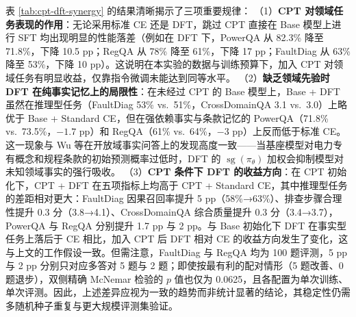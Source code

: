 \documentclass[fontset=fandol,type=master,campus=shenzhen,etitleauto=true]{hithesisbook}
\begin{document}
\begin{table}[htbp]
\centering
\caption{初始化基座（Base vs.\ CPT）与微调目标（Standard CE vs.\ DFT）的 $2 \times 2$ 对比结果}
\label{tab:cpt-dft-synergy}
\small
\setlength{\tabcolsep}{4pt}
\renewcommand{\arraystretch}{1.15}
\end{table}

表 \ref{tab:cpt-dft-synergy} 的结果清晰揭示了三项重要规律：
（1）\textbf{CPT 对领域任务表现的作用}：无论采用标准 CE 还是 DFT，跳过 CPT 直接在 Base 模型上进行 SFT 均出现明显的性能落差（例如在 DFT 下，PowerQA 从 82.3\% 降至 71.8\%，下降 10.5 pp；RegQA 从 78\% 降至 61\%，下降 17 pp；FaultDiag 从 63\% 降至 53\%，下降 10 pp）。这说明在本实验的数据与训练预算下，加入 CPT 对领域任务有明显收益，仅靠指令微调未能达到同等水平。
（2）\textbf{缺乏领域先验时 DFT 在纯事实记忆上的局限性}：在未经过 CPT 的 Base 模型上，Base + DFT 虽然在推理型任务（FaultDiag 53\% vs.\ 51\%，CrossDomainQA 3.1 vs.\ 3.0）上略优于 Base + Standard CE，但在强依赖事实与条款记忆的 PowerQA（71.8\% vs.\ 73.5\%，$-1.7$ pp）和 RegQA（61\% vs.\ 64\%，$-3$ pp）上反而低于标准 CE。这一现象与 Wu 等\cite{ref82}在开放域事实问答上的发现高度一致——当基座模型对电力专有概念和规程条款的初始预测概率过低时，DFT 的 $\operatorname{sg}(\pi_\theta)$ 加权会抑制模型对未知领域事实的强行吸收。
（3）\textbf{CPT 条件下 DFT 的收益方向}：在 CPT 初始化下，CPT + DFT 在五项指标上均高于 CPT + Standard CE，其中推理型任务的差距相对更大：FaultDiag 因果召回率提升 5 pp（58\%→63\%）、排查步骤合理性提升 0.3 分（3.8→4.1）、CrossDomainQA 综合质量提升 0.3 分（3.4→3.7），PowerQA 与 RegQA 分别提升 1.7 pp 与 2 pp。与 Base 初始化下 DFT 在事实型任务上落后于 CE 相比，加入 CPT 后 DFT 相对 CE 的收益方向发生了变化，这与上文的工作假设一致。但需注意，FaultDiag 与 RegQA 均为 100 题评测，5 pp 与 2 pp 分别只对应多答对 5 题与 2 题；即使按最有利的配对情形（5 题改善、0 题退步），双侧精确 McNemar 检验的 $p$ 值也仅为 0.0625，且各配置为单次训练、单次评测。因此，上述差异应视为一致的趋势而非统计显著的结论，其稳定性仍需多随机种子重复与更大规模评测集验证。
\end{document}
